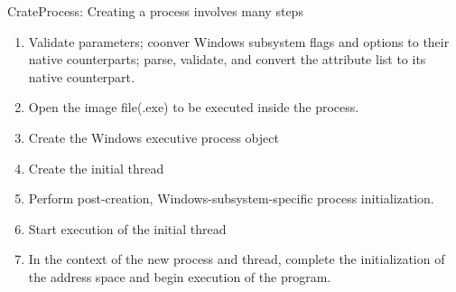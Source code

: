 \documentclass[letterpaper,10pt,draftclsnofoot,onecolumn]{IEEEtran}
\begin{document}
CrateProcess: Creating a process involves many steps
\begin{enumerate}
\item Validate parameters; coonver Windows subsystem flags and options to their native counterparts; parse, validate, and convert the attribute list to its native counterpart.
\item Open the image file(.exe) to be executed inside the process.
\item Create the Windows executive process object
\item Create the initial thread
\item Perform post-creation, Windows-subsystem-specific process initialization.
\item Start execution of the initial thread
\item In the context of the new process and thread, complete the initialization of the address space and begin execution of the program.
\end{enumerate}
\end{document}
